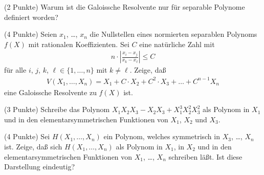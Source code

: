 \documentclass{algsheet}
\begin{document}
\begin{exercise}(2 Punkte)\newline
    Warum ist die Galoissche Resolvente nur für separable Polynome definiert worden?
\end{exercise}

\begin{exercise}(4 Punkte)\newline
    Seien \(x_1\), \dots, \(x_n\) die Nullstellen eines normierten separablen Polynoms \(f(X)\) mit
    rationalen Koeffizienten. Sei \(C\) eine natürliche Zahl mit
    \begin{align*}
        n \cdot \left|{\frac{x_i - x_j}{x_k - x_\ell}}\right| \leq C
    \end{align*}
    für alle \(i\), \(j\), \(k\), \(\ell \in \{1, \dots, n\}\) mit \(k \neq \ell\).
    Zeige, daß
    \begin{align*}
        V(X_1, \dots, X_n) = X_1 + C \cdot X_2 + C^2 \cdot X_3 + \dotsc + C^{n - 1} X_n
    \end{align*}
    eine Galoissche Resolvente zu \(f(X)\) ist.    
\end{exercise}

\begin{exercise}(3 Punkte)\newline
    Schreibe das Polynom \(X_1 X_2 X_3 - X_2 X_3 + X_1^3 X_2^2 X_3^2\) als Polynom in \(X_1\)
    und in den elementarsymmetrischen Funktionen von \(X_1\), \(X_2\) und \(X_3\).
\end{exercise}

\begin{exercise}(4 Punkte)\newline
    Sei \(H(X_1, \dotsc, X_n)\) ein Polynom, welches symmetrisch in \(X_3\), \dots, \(X_n\) ist.
    Zeige, daß sich \(H(X_1, \dotsc, X_n)\)
    als Polynom in \(X_1\), in \(X_2\) und in den elementarsymmetrischen Funktionen von
    \(X_1\), \dots, \(X_n\) schreiben läßt.
    Ist diese Darstellung eindeutig?
\end{exercise}
\end{document}
